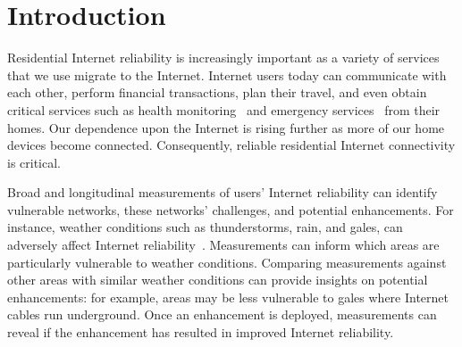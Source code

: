 

\chapter{Introduction}







Residential Internet reliability is increasingly important as a variety of
services that we use migrate to the Internet. Internet users today can
communicate with each other, perform financial transactions, plan
their travel, and even obtain critical services such as health
monitoring~\cite{ideal-life, remote-health-elderly} and emergency
services~\cite{emergency-voip-voipfone, emergency-voip-fcc} from their
homes. Our dependence upon the Internet is rising further as more of
our home devices become connected. Consequently, reliable residential Internet connectivity is critical.

Broad and longitudinal measurements of users' Internet reliability can
identify vulnerable networks, these networks' challenges, and
potential enhancements. For instance, weather conditions such as
thunderstorms, rain, and gales, can adversely affect Internet
reliability~\cite{pingin}. Measurements can inform which areas are
particularly vulnerable to weather conditions. Comparing measurements
against other areas with similar weather conditions can provide
insights on potential enhancements: for example, areas may be less
vulnerable to gales where Internet cables run underground. Once an
enhancement is deployed, measurements can reveal if the enhancement
has resulted in improved Internet reliability.

